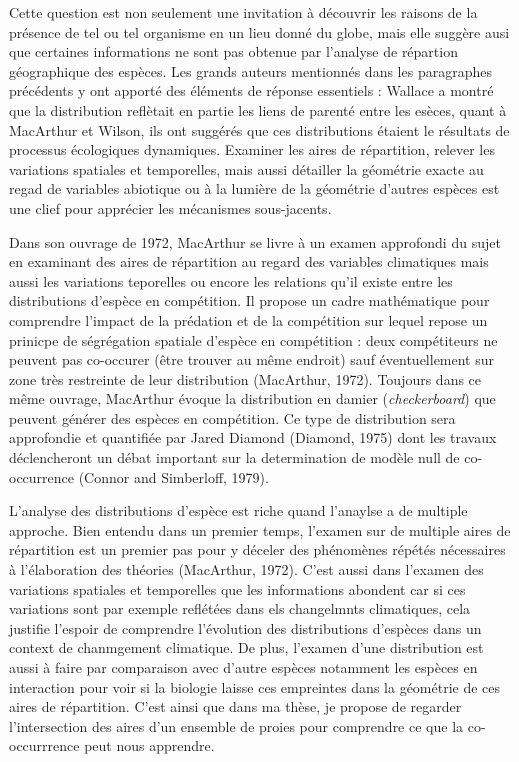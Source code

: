 Cette question est non seulement une invitation à découvrir les raisons
de la présence de tel ou tel organisme en un lieu donné du globe, mais
elle suggère ausi que certaines informations ne sont pas obtenue par
l'analyse de répartion géographique des espèces. Les grands auteurs
mentionnés dans les paragraphes précédents y ont apporté des éléments de
réponse essentiels : Wallace a montré que la distribution reflètait en
partie les liens de parenté entre les esèces, quant à MacArthur et
Wilson, ils ont suggérés que ces distributions étaient le résultats de
processus écologiques dynamiques. Examiner les aires de répartition,
relever les variations spatiales et temporelles, mais aussi détailler la
géométrie exacte au regad de variables abiotique ou à la lumière de la
géométrie d'autres espèces est une clief pour apprécier les mécanismes
sous-jacents.

Dans son ouvrage de 1972, MacArthur se livre à un examen approfondi du
sujet en examinant des aires de répartition au regard des variables
climatiques mais aussi les variations teporelles ou encore les relations
qu'il existe entre les distributions d'espèce en compétition. Il propose
un cadre mathématique pour comprendre l'impact de la prédation et de la
compétition sur lequel repose un prinicpe de ségrégation spatiale
d'espèce en compétition : deux compétiteurs ne peuvent pas co-occurer
(être trouver au même endroit) sauf éventuellement sur zone très
restreinte de leur distribution (MacArthur, 1972). Toujours dans ce même
ouvrage, MacArthur évoque la distribution en damier
(\emph{checkerboard}) que peuvent générer des espèces en compétition. Ce
type de distribution sera approfondie et quantifiée par Jared Diamond
(Diamond, 1975) dont les travaux déclencheront un débat important sur la
determination de modèle null de co-occurrence (Connor and Simberloff,
1979).

L'analyse des distributions d'espèce est riche quand l'anaylse a de
multiple approche. Bien entendu dans un premier temps, l'examen sur de
multiple aires de répartition est un premier pas pour y déceler des
phénomènes répétés nécessaires à l'élaboration des théories (MacArthur,
1972). C'est aussi dans l'examen des variations spatiales et temporelles
que les informations abondent car si ces variations sont par exemple
reflétées dans els changelmnts climatiques, cela justifie l'espoir de
comprendre l'évolution des distributions d'espèces dans un context de
chanmgement climatique. De plus, l'examen d'une distribution est aussi à
faire par comparaison avec d'autre espèces notamment les espèces en
interaction pour voir si la biologie laisse ces empreintes dans la
géométrie de ces aires de répartition. C'est ainsi que dans ma thèse, je
propose de regarder l'intersection des aires d'un ensemble de proies
pour comprendre ce que la co-occurrrence peut nous apprendre.

